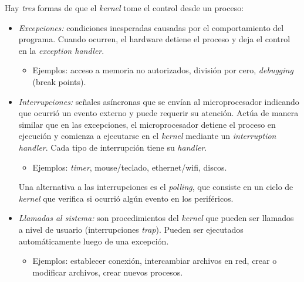 \documentclass[a4paper,10pt,spanish]{article}
\begin{document}
\begin{minipage}[t]{0.45\linewidth}

\begin{center}
\end{center} 

Hay \textit{tres} formas de que el \textit{kernel} tome el control desde un proceso:

\begin{itemize}
\item \textit{Excepciones:} condiciones inesperadas causadas por el comportamiento del programa. Cuando ocurren, el hardware detiene el proceso y deja el control en la \textit{exception handler}.

	\begin{itemize}
	\item Ejemplos: acceso a memoria no autorizados, división por cero, 						\textit{debugging} (break points).
	\end{itemize}
	
\item \textit{Interrupciones:} señales asíncronas que se envían al microprocesador indicando que ocurrió un evento externo y puede requerir su atención. Actúa de manera similar que en las excepciones, el microprocesador detiene el proceso en ejecución y comienza a ejecutarse en el \textit{kernel} mediante un \textit{interruption handler}. Cada tipo de interrupción tiene su \textit{handler}.

	\begin{itemize}
	\item Ejemplos: \textit{timer}, mouse/teclado, ethernet/wifi, discos.
	\end{itemize}

Una alternativa a las interrupciones es el \textit{polling}, que consiste en un ciclo de \textit{kernel} que verifica si ocurrió algún evento en los periféricos.

\item \textit{Llamadas al sistema:} son procedimientos del \textit{kernel} que pueden ser llamados a nivel de usuario (interrupciones \textit{trap}). Pueden ser ejecutados automáticamente luego de una excepción.

	\begin{itemize}
	\item Ejemplos: establecer conexión, intercambiar archivos en red, crear o 				modificar archivos, crear nuevos procesos.
	\end{itemize}


\end{itemize}
\end{minipage}
\end{document}
